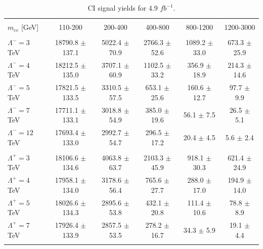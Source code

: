 	\begin{table}[h!]
	\small 
	\centering %
	\begin{tabular}{l ccccc} %
	\hline\hline \\[-2ex] %
	$m_{ee}$ [GeV] & 110-200 & 200-400 & 400-800 & 800-1200 & 1200-3000 \\ [0.2ex]
	\hline  \\[-2ex] %
	$\Lambda^{-} = 3$ TeV & 18790.8 $\pm$ 137.1 & 5022.4 $\pm$ 70.9 & 2766.3 $\pm$ 52.6 & 1089.2 $\pm$ 33.0 & 673.3 $\pm$ 25.9 \\ 
	$\Lambda^{-} = 4$ TeV & 18212.5 $\pm$ 135.0 & 3707.1 $\pm$ 60.9 & 1102.5 $\pm$ 33.2 & 356.9 $\pm$ 18.9 & 214.3 $\pm$ 14.6 \\ 
	$\Lambda^{-} = 5$ TeV & 17821.5 $\pm$ 133.5 & 3310.5 $\pm$ 57.5 & 653.1 $\pm$ 25.6 & 160.6 $\pm$ 12.7 & 97.7 $\pm$ 9.9 \\ 
	$\Lambda^{-} = 7$ TeV & 17711.1 $\pm$ 133.1 & 3018.8 $\pm$ 54.9 & 385.0 $\pm$ 19.6 & 56.1 $\pm$ 7.5 & 26.5 $\pm$ 5.1 \\ 
	$\Lambda^{-} = 12$ TeV & 17693.4 $\pm$ 133.0 & 2992.7 $\pm$ 54.7 & 296.5 $\pm$ 17.2 & 20.4 $\pm$ 4.5 & 5.6 $\pm$ 2.4 \\ 
	\hline  \\[-2ex] %
	$\Lambda^{+} = 3$ TeV & 18106.6 $\pm$ 134.6 & 4063.8 $\pm$ 63.7 & 2103.3 $\pm$ 45.9 & 918.1 $\pm$ 30.3 & 621.4 $\pm$ 24.9 \\ 
	$\Lambda^{+} = 4$ TeV & 17958.1 $\pm$ 134.0 & 3178.6 $\pm$ 56.4 & 765.6 $\pm$ 27.7 & 288.0 $\pm$ 17.0 & 194.9 $\pm$ 14.0 \\ 
	$\Lambda^{+} = 5$ TeV & 18026.6 $\pm$ 134.3 & 2895.6 $\pm$ 53.8 & 432.1 $\pm$ 20.8 & 111.4 $\pm$ 10.6 & 78.8 $\pm$ 8.9 \\ 
	$\Lambda^{+} = 7$ TeV & 17926.4 $\pm$ 133.9 & 2857.5 $\pm$ 53.5 & 278.2 $\pm$ 16.7 & 34.3 $\pm$ 5.9 & 19.1 $\pm$ 4.4 \\ 
	\hline\hline  \\ %
	\end{tabular}
	\caption{CI signal yields for 4.9 $fb^{-1}$.} %
	\label{tab:CIyeilds}
	\end{table}

